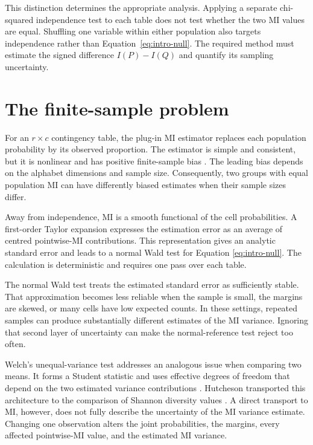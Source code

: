 This distinction determines the appropriate analysis. Applying a separate
chi-squared independence test to each table does not test whether the two MI
values are equal. Shuffling one variable within either population also targets
independence rather than Equation~\eqref{eq:intro-null}. The required method
must estimate the signed difference \(I(P)-I(Q)\) and quantify its sampling
uncertainty.

\section{The finite-sample problem}

For an \(r\times c\) contingency table, the plug-in MI estimator replaces each
population probability by its observed proportion. The estimator is simple
and consistent, but it is nonlinear and has positive finite-sample bias
\citep{miller1955,moddemeijer1989,paninski2003}. The leading bias depends on
the alphabet dimensions and sample size. Consequently, two groups with equal
population MI can have differently biased estimates when their sample sizes
differ.

Away from independence, MI is a smooth functional of the cell probabilities.
A first-order Taylor expansion expresses the estimation error as an average of
centred pointwise-MI contributions. This representation gives an analytic
standard error and leads to a normal Wald test for Equation
\eqref{eq:intro-null}. The calculation is deterministic and requires one pass
over each table.

The normal Wald test treats the estimated standard error as sufficiently
stable. That approximation becomes less reliable when the sample is small,
the margins are skewed, or many cells have low expected counts. In these
settings, repeated samples can produce substantially different estimates of
the MI variance. Ignoring that second layer of uncertainty can make the
normal-reference test reject too often.

Welch's unequal-variance test addresses an analogous issue when comparing two
means. It forms a Student statistic and uses effective degrees of freedom that
depend on the two estimated variance contributions
\citep{satterthwaite1946,welch1947}. Hutcheson transported this architecture
to the comparison of Shannon diversity values \citep{hutcheson1970}. A direct
transport to MI, however, does not fully describe the uncertainty of the MI
variance estimate. Changing one observation alters the joint probabilities,
the margins, every affected pointwise-MI value, and the estimated MI variance.

